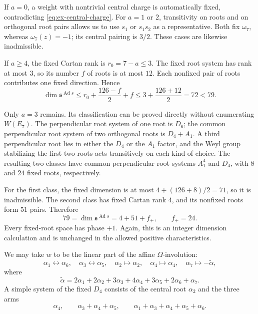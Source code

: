 \documentclass[11pt,a4paper]{article}
\theoremstyle{definition}
\theoremstyle{remark}
\begin{document}
If \(a=0\), a weight with nontrivial central charge is automatically fixed,
contradicting \eqref{eq:ex-central-charge}.
For \(a=1\) or \(2\), transitivity on roots and on orthogonal root pairs
allows us to use \(s_1\) or \(s_1s_2\) as a representative.
Both fix \(\omega_7\), whereas \(\omega_7(z)=-1\); its central pairing is
\(3/2\). These cases are likewise inadmissible.

If \(a\ge4\), the fixed Cartan rank is \(r_0=7-a\le3\).
The fixed root system has rank at most \(3\), so its number \(f\) of roots
is at most \(12\).
Each nonfixed pair of roots contributes one fixed direction. Hence
\begin{equation}\label{eq:ex-e7-large-negative-rank}
\dim\mathfrak s^{\operatorname{Ad}s}
\le r_0+\frac{126-f}{2}+f
\le3+\frac{126+12}{2}=72<79.
\end{equation}

Only \(a=3\) remains. Its classification can be proved directly without
enumerating \(W(E_7)\). The perpendicular root system of one root is
\(D_6\); the common perpendicular root system of two orthogonal roots is
\(D_4+A_1\). A third perpendicular root lies in either the \(D_4\) or the
\(A_1\) factor, and the Weyl group stabilizing the first two roots acts
transitively on each kind of choice.
The resulting two classes have common perpendicular root systems
\(A_1^4\) and \(D_4\), with \(8\) and \(24\) fixed roots, respectively.

For the first class, the fixed dimension is at most
\(4+(126+8)/2=71\), so it is inadmissible.
The second class has fixed Cartan rank \(4\), and its nonfixed roots form
\(51\) pairs. Therefore
\begin{equation}\label{eq:ex-e7-fixed-phase-count}
79=\dim\mathfrak s^{\operatorname{Ad}s}=4+51+f_+,
\qquad f_+=24.
\end{equation}
Every fixed-root space has phase \(+1\).
Again, this is an integer dimension calculation and is unchanged in the
allowed positive characteristics.

We may take \(w\) to be the linear part of the affine \(\Omega\)-involution:
\begin{equation}\label{eq:ex-e7-affine-action}
\alpha_1\leftrightarrow\alpha_6,\quad
\alpha_3\leftrightarrow\alpha_5,\quad
\alpha_2\mapsto\alpha_2,\quad
\alpha_4\mapsto\alpha_4,\quad
\alpha_7\mapsto-\widetilde\alpha,
\end{equation}
where
\begin{equation}\label{eq:ex-e7-highest-root}
\widetilde\alpha
=2\alpha_1+2\alpha_2+3\alpha_3+4\alpha_4
 +3\alpha_5+2\alpha_6+\alpha_7.
\end{equation}
A simple system of the fixed \(D_4\) consists of the central root
\(\alpha_2\) and the three arms
\begin{equation}\label{eq:ex-e7-fixed-d4-basis}
\alpha_4,\qquad
\alpha_3+\alpha_4+\alpha_5,\qquad
\alpha_1+\alpha_3+\alpha_4+\alpha_5+\alpha_6.
\end{equation}
\end{document}
